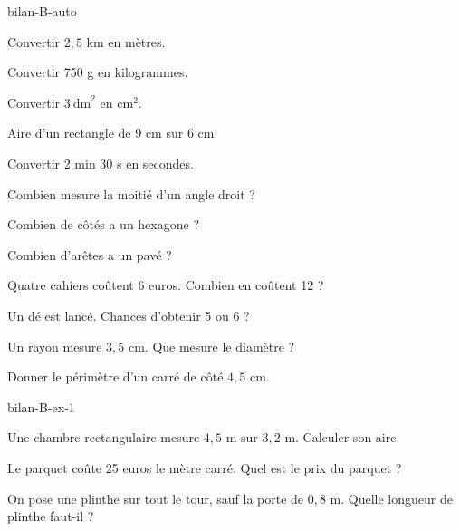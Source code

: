 \begin{blocEdition}{bilan-B-auto}
\begin{questions}
\item Convertir $2{,}5$ km en mètres.
\item Convertir 750 g en kilogrammes.
\item Convertir $3\ \mathrm{dm}^2$ en $\mathrm{cm}^2$.
\item Aire d’un rectangle de 9 cm sur 6 cm.
\item Convertir 2 min 30 s en secondes.
\item Combien mesure la moitié d’un angle droit ?
\item Combien de côtés a un hexagone ?
\item Combien d’arêtes a un pavé ?
\item Quatre cahiers coûtent 6 euros. Combien en coûtent 12 ?
\item Un dé est lancé. Chances d’obtenir 5 ou 6 ?
\item Un rayon mesure $3{,}5$ cm. Que mesure le diamètre ?
\item Donner le périmètre d’un carré de côté $4{,}5$ cm.\end{questions}
\end{blocEdition}
\begin{blocEdition}{bilan-B-ex-1}
\begin{questions}
\item Une chambre rectangulaire mesure $4{,}5$ m sur $3{,}2$ m. Calculer son aire.
\item Le parquet coûte 25 euros le mètre carré. Quel est le prix du parquet ?
\item On pose une plinthe sur tout le tour, sauf la porte de $0{,}8$ m. Quelle longueur de plinthe faut-il ?
\end{questions}\par{}\par\par{}\par{}\par{}\par{}\par{}\par{}
\end{blocEdition}
